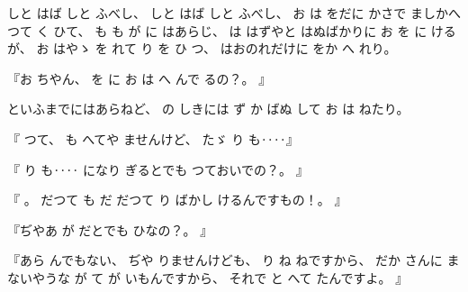 
%
しと
はば
しと
ふべし、
%
しと
はば
しと
ふべし、
%
お
は
をだに
かさで
ましかへつて
く
ひて、
%
も
も
が
に
はあらじ、
%
は
はずやと
はぬばかりに
お
を
に
けるが、
%
お
はやゝ
を
れて
り
を
ひ
つ、
%
はおのれだけに
をか
へ
れり。

%
『お
ちやん、
%
を
に
お
は
へ
んで
るの？。
』

%
といふまでにはあらねど、
%
の
しきには
ず
か
ばぬ
して
お
は
ねたり。

%
『
つて、
%
も
へてや
ませんけど、
%
たゞ
り
も‥‥』

%
『
り
も‥‥
になり
ぎるとでも
つておいでの？。
』

%
『
。
%
だつて
も
だ
だつて
り
ばかし
けるんですもの！。
』

%
『ぢやあ
が
だとでも
ひなの？。
』

%
『あら
んでもない、
%
ぢや
りませんけども、
%
り
ね
ねですから、
%
だか
さんに
まないやうな
が
て
が
いもんですから、
%
それで
と
へて
たんですよ。
』


